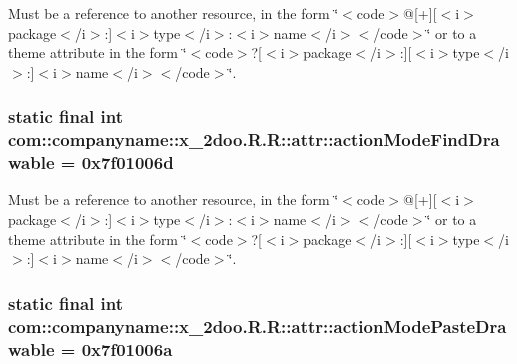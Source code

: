 Must be a reference to another resource, in the form \char`\"{}$<$code$>$@\mbox{[}+\mbox{]}\mbox{[}$<$i$>$package$<$/i$>$:\mbox{]}$<$i$>$type$<$/i$>$:$<$i$>$name$<$/i$>$$<$/code$>$\char`\"{} or to a theme attribute in the form \char`\"{}$<$code$>$?\mbox{[}$<$i$>$package$<$/i$>$:\mbox{]}\mbox{[}$<$i$>$type$<$/i$>$:\mbox{]}$<$i$>$name$<$/i$>$$<$/code$>$\char`\"{}. \hypertarget{classcom_1_1companyname_1_1x__2doo_1_1_r_1_1attr_c54a1c011765defa86695a6c74cd6678}{
\subsubsection[{actionModeFindDrawable}]{\setlength{\rightskip}{0pt plus 5cm}static final int com::companyname::x\_\-2doo.R.R::attr::actionModeFindDrawable = 0x7f01006d}}
\label{classcom_1_1companyname_1_1x__2doo_1_1_r_1_1attr_c54a1c011765defa86695a6c74cd6678}


Must be a reference to another resource, in the form \char`\"{}$<$code$>$@\mbox{[}+\mbox{]}\mbox{[}$<$i$>$package$<$/i$>$:\mbox{]}$<$i$>$type$<$/i$>$:$<$i$>$name$<$/i$>$$<$/code$>$\char`\"{} or to a theme attribute in the form \char`\"{}$<$code$>$?\mbox{[}$<$i$>$package$<$/i$>$:\mbox{]}\mbox{[}$<$i$>$type$<$/i$>$:\mbox{]}$<$i$>$name$<$/i$>$$<$/code$>$\char`\"{}. \hypertarget{classcom_1_1companyname_1_1x__2doo_1_1_r_1_1attr_f3109503a593354ec182a78ec9eca547}{
\subsubsection[{actionModePasteDrawable}]{\setlength{\rightskip}{0pt plus 5cm}static final int com::companyname::x\_\-2doo.R.R::attr::actionModePasteDrawable = 0x7f01006a}}
\label{classcom_1_1companyname_1_1x__2doo_1_1_r_1_1attr_f3109503a593354ec182a78ec9eca547}


